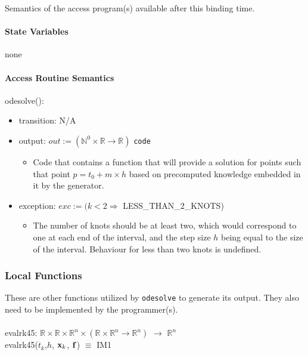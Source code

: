 \documentclass[12pt, titlepage]{article}
\begin{document}
Semantics of the access program(s) available after this binding time.

\paragraph{State Variables}

none

\paragraph{Access Routine Semantics}

\noindent odesolve():
\begin{itemize}
  \item transition: N/A
  \item output: $ out := (\mathbb{N}^0 \times \mathbb{R} \rightarrow 
  \mathbb{R})$ 
  \texttt{code}
  \begin{itemize}
    \item Code that contains a function that will provide a solution for points 
    such that point $p = t_0 + m \times h$ based on precomputed knowledge
    embedded in it by the generator. 
  \end{itemize}
  \item exception: $exc := (k < 2 \Rightarrow$ LESS\_THAN\_2\_KNOTS)
  \begin{itemize}
    \item The number of knots should be at least two, which would correspond to 
    one at each end of the interval, and the step size $h$ being equal to the 
    size of the interval. Behaviour for less than two knots is undefined.
  \end{itemize}
\end{itemize}

\subsubsection{Local Functions} 
These are other functions utilized by \lstinline[language=ML]|odesolve| to 
generate its output. They also need to be implemented by the programmer(s).\\
\\
evalrk45: $\mathbb{R} \times \mathbb{R} \times \mathbb{R}^n \times (\mathbb{R} 
\times \mathbb{R}^n \rightarrow \mathbb{R}^n)$ $\rightarrow$ $\mathbb{R}^n$\\
evalrk45($t_k$,$h$, ${\bf x}_k$, ${\bf f}$) $\equiv$ IM1
\end{document}
